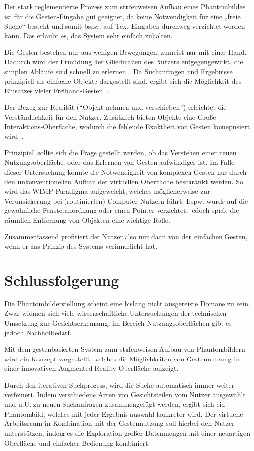\documentclass{sigchi-ext}
\begin{document}
Der stark reglementierte Prozess zum stufenweisen Aufbau eines
Phantombildes ist für die Gesten-Eingabe gut geeignet, da keine
Notwendigkeit für eine „freie Suche“ besteht und somit bspw. auf
Text-Eingaben durchweg verzichtet werden kann. Das erlaubt es, das
System sehr einfach zuhalten.

Die Gesten bestehen nur aus wenigen Bewegungen, zumeist nur mit einer
Hand. Dadurch wird der Ermüdung der Gliedmaßen des Nutzers
entgegengewirkt, die simplen Abläufe sind schnell zu
erlernen~\cite{vrs:book}. 
Da Suchanfragen und Ergebnisse prinzipiell
als einfache Objekte dargestellt sind, ergibt sich die Möglichkeit des
Einsatzes vieler Freihand-Gesten~\cite{3dinteraction:book}. 

Der Bezug zur Realität (``Objekt nehmen und verschieben'') erleichtet die
Verständlichkeit für den Nutzer. Zusätzlich bieten Objekte eine Große
Interaktions-Oberfläche, wodurch die fehlende Exaktheit von Gesten
komepnsiert wird~\cite{vrs:book}.

Prinzipiell sollte sich die Frage gestellt werden, ob das Verstehen
einer neuen Nutzungsoberfläche, oder das Erlernen von Gesten
aufwändiger ist. 
Im Falle dieser Untersuchung konnte die Notwendigkeit
von komplexen Gesten nur durch den unkonventionellen Aufbau der
virtuellen Oberfläche beschränkt werden. So wird das WIMP-Paradigma
aufgeweicht, welches möglicherweise zur Verunsicherung bei (routinierten)
Computer-Nutzern führt. Bspw. wurde auf die gewöhnliche
Fensteranordnung oder einen Pointer verzichtet, jedoch spielt die
räumlich Entfernung von Objekten eine wichtige Rolle. 

Zusammenfassend profitiert der Nutzer also nur dann von den einfachen Gesten, wenn er das Prinzip des Systems verinnerlicht hat. 

\section{Schlussfolgerung}
Die Phantombilderstellung scheint eine bislang nicht ausgereizte
Domäne zu sein. Zwar widmen sich viele wissenschaftliche
Untersuchungen der technischen Umsetzung zur Gesichtserkennung, im
Bereich Nutzungsoberflächen gibt es jedoch Nachholbedarf. 

Mit dem gestenbasierten System zum stufenweisen Aufbau von
Phantombildern wird ein Konzept vorgestellt, welches die Möglichkeiten
von Gestennutzung in einer innovativen Augmented-Reality-Oberfläche
aufzeigt.

Durch den iterativen Suchprozess, wird die Suche automatisch immer weiter verfeinert.
Indem verschiedene Arten von Gesichtsteilen vom Nutzer ausgewählt und
u.U. zu neuen Suchanfragen zusammengefügt werden, ergibt sich ein
Phantombild, welches mit jeder Ergebnis-auswahl konkreter wird. Der
virtuelle Arbeitsraum in Kombination mit der Gestennutzung soll
hierbei den Nutzer unterstützen, indem es die Exploration großer
Datenmengen mit einer neuartigen Oberfläche und einfacher Bedienung
kombiniert. 
\end{document}
